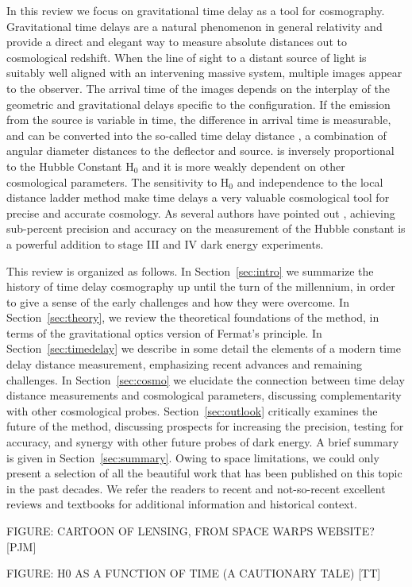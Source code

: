 In this review we focus on gravitational time delay as a tool for
cosmography.  Gravitational time delays are a natural phenomenon in
general relativity and provide a direct and elegant way to measure
absolute distances out to cosmological redshift. When the line of
sight to a distant source of light is suitably well aligned with an
intervening massive system, multiple images appear to the
observer. The arrival time of the images depends on the interplay of
the geometric and gravitational delays specific to the
configuration. If the emission from the source is variable in time,
the difference in arrival time is measurable, and can be converted
into the so-called time delay distance \DDT, a combination of angular
diameter distances to the deflector and source. \DDT is inversely
proportional to the Hubble Constant H$_0$ and it is more weakly
dependent on other cosmological parameters. The sensitivity to H$_0$
and independence to the local distance ladder method make time delays
a very valuable cosmological tool for precise and accurate
cosmology. As several authors have pointed out
\cite{Lin11,Suy++12,Wei++13}, achieving sub-percent precision and
accuracy on the measurement of the Hubble constant is a powerful
addition to stage III and IV dark energy experiments.

This review is organized as follows. In Section~\ref{sec:intro} we
summarize the history of time delay cosmography up until the turn of
the millennium, in order to give a sense of the early challenges and
how they were overcome. In Section~\ref{sec:theory}, we review the
theoretical foundations of the method, in terms of the gravitational
optics version of Fermat's principle. In Section~\ref{sec:timedelay}
we describe in some detail the elements of a modern time delay
distance measurement, emphasizing recent advances and remaining
challenges. In Section~\ref{sec:cosmo} we elucidate the connection
between time delay distance measurements and cosmological parameters,
discussing complementarity with other cosmological
probes. Section~\ref{sec:outlook} critically examines the future of
the method, discussing prospects for increasing the precision, testing
for accuracy, and synergy with other future probes of dark energy. A
brief summary is given in Section~\ref{sec:summary}. Owing to space
limitations, we could only present a selection of all the beautiful
work that has been published on this topic in the past decades. We
refer the readers to recent
\cite{Bar10,Ell10,Tre10,TMC12,Jackson:2013p30763,Jac15,T+E15} and not-so-recent \cite{B+N92,CSS02,K+S04,Fal05,SKW06}
excellent reviews and textbooks \cite{SEF92} for additional
information and historical context.

FIGURE: CARTOON OF LENSING, FROM SPACE WARPS WEBSITE? [PJM]

FIGURE: H0 AS A FUNCTION OF TIME (A CAUTIONARY TALE) [TT]

